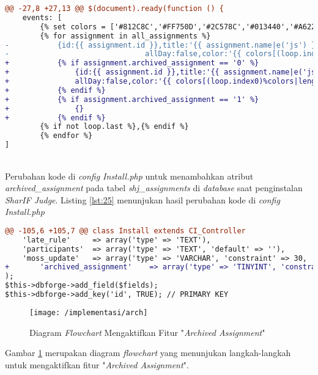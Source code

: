 \begin{lstlisting}[language=diff, caption=Perubahan kode program pada halaman \textit{dashboard.twig}, label=lst:24, basicstyle=\ttfamily, frame=single,
columns=fullflexible, keepspaces=true, breaklines=true]
@@ -27,8 +27,13 @@ $(document).ready(function () {
	events: [
		{% set colors = ['#812C8C','#FF750D','#2C578C','#013440','#A6222C','#42758C','#02A300','#BA6900'] %}
		{% for assignment in all_assignments %}
-       	{id:{{ assignment.id }},title:'{{ assignment.name|e('js') }}', start:'{{ assignment.start_time }}', end:' {{ assignment.finish_time }}',
-                               allDay:false,color:'{{ colors[(loop.index0)%colors|length] }}'}
+       	{% if assignment.archived_assignment == '0' %}
+           	{id:{{ assignment.id }},title:'{{ assignment.name|e('js') }}', start:'{{ assignment.start_time }}', end:' {{ assignment.finish_time }}',
+               allDay:false,color:'{{ colors[(loop.index0)%colors|length] }}'}
+        	{% endif %}
+        	{% if assignment.archived_assignment == '1' %}
+           	{}
+        	{% endif %}
		{% if not loop.last %},{% endif %}
		{% endfor %}
]
\end{lstlisting}
~\\
Perubahan kode di \textit{config Install.php} untuk menambahkan atribut \textit{archived\_assignment} pada tabel \textit{shj\_assignments} di \textit{database} saat penginstalan \textit{SharIF Judge}. Listing \ref{lst:25} menunjukan hasil perubahan kode di \textit{config Install.php}

\begin{lstlisting}[language=diff, caption=Perubahan kode program pada \textit{Install.php}, label=lst:25, basicstyle=\ttfamily, frame=single,
columns=fullflexible, keepspaces=true, breaklines=true]
@@ -105,6 +105,7 @@ class Install extends CI_Controller
	'late_rule'     => array('type' => 'TEXT'),
	'participants'  => array('type' => 'TEXT', 'default' => ''),
	'moss_update'   => array('type' => 'VARCHAR', 'constraint' => 30, 'default' => 'Never'),
+   	'archived_assignment'    => array('type' => 'TINYINT', 'constraint' => 1),
);
$this->dbforge->add_field($fields);
$this->dbforge->add_key('id', TRUE); // PRIMARY KEY
\end{lstlisting}

\begin{figure}[H]
	\centering  
	\texttt{[image: /implementasi/arch]}  
	\caption[Diagram \textit{Flowchart} Mengaktifkan Fitur "\textit{Archived Assignment}"]{Diagram \textit{Flowchart} Mengaktifkan Fitur "\textit{Archived Assignment}"} 
	\label{fig:iarch} 
\end{figure}
Gambar \ref{fig:iarch} merupakan diagram \textit{flowchart} yang menunjukan langkah-langkah untuk mengaktifkan fitur "\textit{Archived Assignment}".

